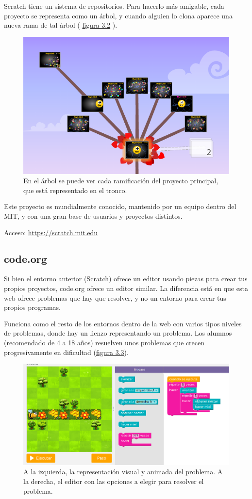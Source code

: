 \documentclass{report}
\begin{document}
	\vspace{10px}
	
	Scratch tiene un sistema de repositorios. Para hacerlo más amigable, cada proyecto se representa como un árbol, y cuando alguien lo clona aparece una nueva rama de tal árbol ( \hyperref[fig:scratch2]{figura 3.2} ).
		
\begin{figure}
\centering
\includegraphics[width=0.7\linewidth]{scratch2}
\caption[Árbol de proyectos en Scratch.]{En el árbol se puede ver cada ramificación del proyecto principal, que está representado en el tronco.}
\label{fig:scratch2}
\end{figure}

	Este proyecto es mundialmente conocido, mantenido por un equipo dentro del MIT, y con una gran base de usuarios y proyectos distintos.
	
	Acceso: \url{https://scratch.mit.edu}
	
	\subsection{code.org}
	
	Si bien el entorno anterior (Scratch) ofrece un editor usando piezas para crear tus propios proyectos, code.org ofrece un editor similar. La diferencia está en que esta web ofrece problemas que hay que resolver, y no un entorno para crear tus propios programas.
	
	Funciona como el resto de los entornos dentro de la web con varios tipos niveles de problemas, donde hay un lienzo representando un problema. Los alumnos (recomendado de 4 a 18 años) resuelven unos problemas que crecen progresivamente en dificultad (\hyperref[fig:codeorg]{figura 3.3}). 
	
	\begin{figure}
	\centering
	\includegraphics[width=0.7\linewidth]{codeorg}
	\caption[Resolviendo un problema en code.org]{A la izquierda, la representación visual y animada del problema. A la derecha, el editor con las opciones a elegir para resolver el problema.}
	\label{fig:codeorg}
	\end{figure}
\end{document}
